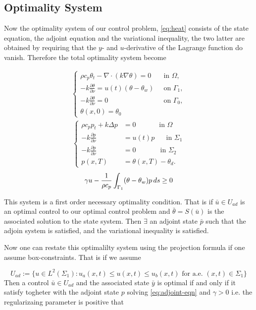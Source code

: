 \subsection{Optimality System}
Now the optimality system of our control problem, \eqref{eq:heat} consists of the state equation, the adjoint equation and the variational inequality, the two latter are obtained by requiring that the $y$- and $u$-derivative of the Lagrange function do vanish. Therefore the total optimality system become

\begin{align*}
    \begin{cases}
     \rho c_p \theta_t - \nabla \cdot (k \nabla \theta) = 0 \quad & \text{in $\Omega$}, \\
      -k \frac{\partial \theta}{\partial \nu} = u(t) (\theta - \theta_w) &\text{on } \Gamma_1, \\
      -k \frac{\partial \theta}{\partial \nu} = 0  &\text{on } \Gamma_0, \\
      \theta(x, 0) = \theta_0 
      \end{cases}
      \end{align*}
      \begin{align*}
      \begin{cases}
       \rho c_p p_t + k\Delta p &= 0 \quad\qquad\textrm{ in } \Omega \\
      -k\frac{\partial p}{\partial\nu} &= u(t)p \,\,\quad\textrm{ in } \Sigma_1 \\
      -k\frac{\partial p}{\partial\nu} &= 0 \,\quad\qquad\textrm{ in } \Sigma_2 \\
      p(x, T) &= \theta(x, T) - \theta_d.
      \end{cases}
      \end{align*}
\begin{equation*}
      \gamma u - \frac{1}{\rho c_p} \int_{\Gamma_1} (\theta - \theta_w)p \mathop{ds} \geq 0
\end{equation*}

This system is a first order necessary optimality condition. That is if $\bar{u} \in U_{ad}$ is an optimal control to our optimal control problem and $\bar{\theta} = S(\bar{u})$ is the associated solution to the state system. Then $\exists$ an adjoint state $\bar{p}$ such that the adjoin system is satisfied, and the variational inequality is satisfied. 

Now one can restate this optimalilty system using the projection formula if one assume box-constraints. That is if we assume

\begin{equation}
    \label{eq:box_constraints}
    U_{ad} := \{ u \in L^2(\Sigma_1): u_a(x,t) \leq u(x,t) \leq u_b(x,t) \text{ for a.e. } (x,t) \in \Sigma_1 \}
\end{equation}
Then a control $\bar{u} \in U_{ad}$ and the associated state $\bar{y}$ is optimal if and only if it satisfy togheter with the adjoint state $p$ solving \eqref{eq:adjoint-eqn}  and $\gamma >0$ i.e. the regularizaing parameter is positive that
